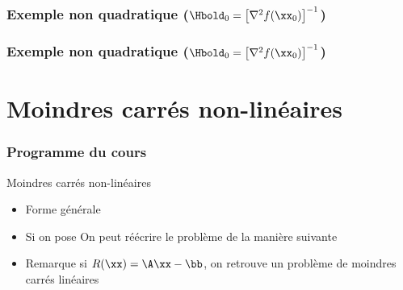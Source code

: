 \documentclass[9pt,table]{beamer} %
\begin{document}
\begin{frame}
\frametitle{Exemple non quadratique ($\Hbold_0 = \left[ \nabla^2 f(\xx_0) \right]^{-1}$)}


\end{frame}

\begin{frame}
\frametitle{Exemple non quadratique ($\Hbold_0 = \left[ \nabla^2 f(\xx_0) \right]^{-1}$)}


\end{frame}



\section{Moindres carrés non-linéaires}
\begin{frame}
\frametitle{Programme du cours}
\tableofcontents[currentsection]
\end{frame}



\begin{frame}{Moindres carrés non-linéaires}

\begin{itemize}[label=\tiny$\blacksquare$]
  \item Forme générale

\pause

\item Si on pose
On peut réécrire le problème de la manière suivante
  \item \alert{Remarque}
    si $R(\xx)= \A\xx - \bb$, on retrouve un problème de moindres carrés linéaires
   \end{itemize}
\end{frame}
\end{document}
